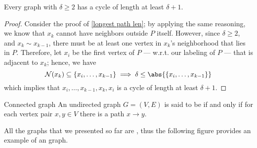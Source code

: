 \documentclass[a4paper, 12pt]{report}
\begin{document}
    \begin{framedprop}[label={min deg 2}]{}
        Every graph with $\delta \ge 2$ has a cycle of length at least $\delta + 1$.
    \end{framedprop}

    \begin{proof}
        Consider the proof of \cref{longest path len}; by applying the same reasoning, we know that $x_k$ cannot have neighbors outside $P$ itself. However, since $\delta \ge 2$, and $x_k \sim x_{k - 1}$, there must be at least one vertex in $x_k$'s neighborhood that lies in $P$. Therefore, let $x_i$ be the first vertex of $P$ --- w.r.t. our labeling of $P$ --- that is adjacent to $x_k$; hence, we have $$\mathcal N (x_k) \subseteq \{x_i, \ldots, x_{k - 1}\} \implies \delta \le \abs{\{x_i, \ldots, x_{k - 1}\}}$$ which implies that $x_i, \ldots, x_{k - 1}, x_k, x_i$ is a cycle of length at least $\delta + 1$.
    \end{proof}

    \begin{frameddefn}{Connected graph}
        An undirected graph $G = (V, E)$ is said to be  if and only if for each vertex pair $x, y \in V$ there is a path $x \to y$.
    \end{frameddefn}

    All the graphs that we presented so far are , thus the following figure provides an example of an  graph.

    \begin{figure}[H]
        \centering
    \end{figure}
\end{document}
